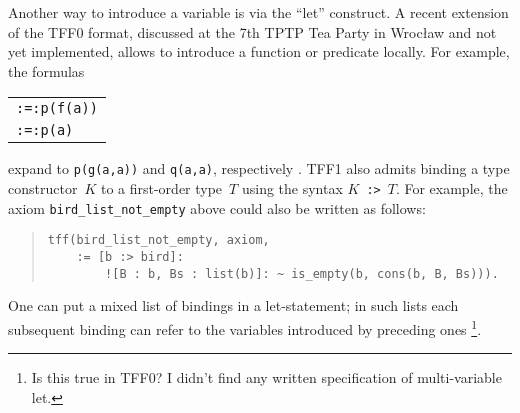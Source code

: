 Another way to introduce a variable is via the ``let'' construct.
A recent extension of the TFF0 format, discussed at the 7th TPTP Tea Party in
Wrocław and not yet implemented, allows to introduce a function or predicate
locally. For example, the formulas
\begin{center}
\begin{tabular}{l}
{\tt :=\;[X\;:\;\$int,\;f(X)\;=\;g(X,\;X)]:\;p(f(a))} \\[\smallskipamount]
{\tt :=\;[X\;:\;\$int,\;p(X)\;<=>\;q(X,\;X)]:\;p(a)}
\end{tabular}
\end{center}
expand to {\tt p(g(a,\;a))} and {\tt q(a,\;a)}, respectively
\cite{geoff-tptptp-notes}.
TFF1 also admits binding a type constructor~$K$ to a first-order type~$T$ using
the syntax $K$~{\tt :>}~$T$.
%
%
%
For example,
the axiom \verb+bird_list_not_empty+ above could also be written as
follows:
\begin{quote}
\begin{verbatim}
tff(bird_list_not_empty, axiom,
    := [b :> bird]:
        ![B : b, Bs : list(b)]: ~ is_empty(b, cons(b, B, Bs))).
\end{verbatim}
\end{quote}
One can put a mixed list of bindings in a let-statement;
in such lists each subsequent binding can refer
to the variables introduced by preceding ones%
\footnote{Is this true in TFF0? I didn't find any written
specification of multi-variable let.}.

